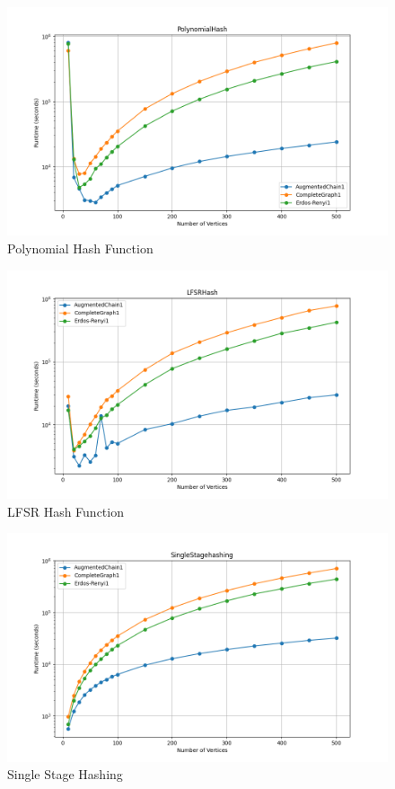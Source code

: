\documentclass{article}
\begin{document}
\begin{figure}[H]
    \centering
    \includegraphics[width=0.8\linewidth]{figures/PolynomialHash(fixedK).png}
    \caption{Polynomial Hash Function}
    \label{fig:PolynomialHash}
\end{figure}

\begin{figure}[H]
    \centering
    \includegraphics[width=0.8\linewidth]{figures/LFSRHash(fixedK).png}
    \caption{LFSR Hash Function}
    \label{fig:LFSRHash}
\end{figure}

\begin{figure}[H]
    \centering
    \includegraphics[width=0.8\linewidth]{figures/SingleStagehashing(fixedK).png}
    \caption{Single Stage Hashing}
    \label{fig:SingleStagehashing}
\end{figure}
\end{document}
